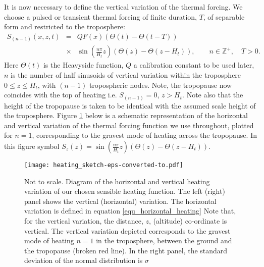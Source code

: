 \documentclass[a4paper,10pt]{article}
\newcommand{\heavi}{\Theta}
\begin{document}
It is now necessary to define the vertical variation of the thermal forcing. 
We choose a pulsed or transient thermal forcing of finite duration, $T$, of separable form and restricted to the troposphere:
%
\begin{eqnarray}
\label{equ_heating_defn}
S_{(n-1)}(x,z,t) & = & Q F(x) \left( \heavi(t) - \heavi(t-T) \right) \\ \nonumber
           & \times & \sin \left( \frac{n \pi}{H_t} z \right)  (\heavi(z) - \heavi(z-H_t)), \quad \quad n \in \mathbb{Z}^+, \quad T>0.
\end{eqnarray}
%
Here $\heavi(t)$ is the Heavyside function, $Q$ a calibration constant to be used later, 
$n$ is the number of half sinusoids of vertical variation within the troposphere $0\leq z \leq H_t$,
with $(n-1)$ tropospheric nodes. Note, the tropopause now coincides with the top of heating i.e. $S_{(n-1)} =0$, $z>H_t$.
Note also that the height of the tropopause is taken to be identical with the assumed scale height of the troposphere.
Figure \ref{heating diagram} below is a schematic representation of the horizontal and vertical variation of the thermal forcing function 
we use throughout, plotted for $n=1$, corresponding to the gravest mode of heating across the tropopause. 
In this figure symbol $S_z (z) =  \sin \left( \frac{n \pi}{H_t} z \right) \left( \heavi(z) - \heavi(z-H_t) \right)$.
%
%
\begin{figure}[h!]
  \centering
    \texttt{[image: heating\_sketch-eps-converted-to.pdf]}
    \caption{ Not to scale. Diagram of the horizontal and vertical heating variation of our
	      chosen sensible heating function. 
              The left (right) panel shows the vertical (horizontal) variation. 
              The horizontal variation is defined in equation \ref{equ_horizontal_heating}
              Note that, for the vertical variation, the distance, $z$, (altitude) co-ordinate is vertical. 
              The vertical variation depicted corresponds to the gravest mode of heating 
              $n=1$ in the troposphere, between the ground and the tropopause (broken red line). 
              In the right panel, the standard deviation of the normal distribution is $\sigma$ }
  \label{heating diagram}
\end{figure}
%
\end{document}
